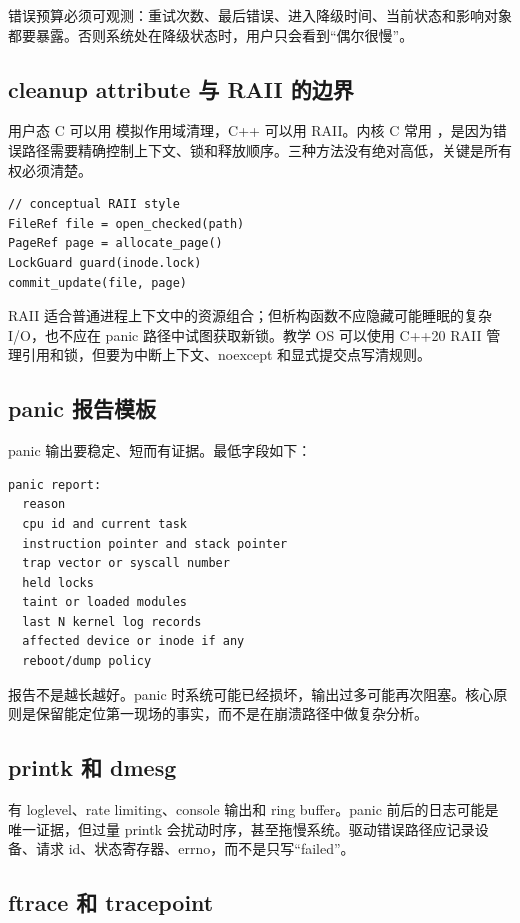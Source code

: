 错误预算必须可观测：重试次数、最后错误、进入降级时间、当前状态和影响对象都要暴露。否则系统处在降级状态时，用户只会看到“偶尔很慢”。

\subsection{cleanup attribute 与 RAII 的边界}

用户态 C 可以用  模拟作用域清理，C++ 可以用 RAII。内核 C 常用 ，是因为错误路径需要精确控制上下文、锁和释放顺序。三种方法没有绝对高低，关键是所有权必须清楚。

\begin{lstlisting}
// conceptual RAII style
FileRef file = open_checked(path)
PageRef page = allocate_page()
LockGuard guard(inode.lock)
commit_update(file, page)
\end{lstlisting}

RAII 适合普通进程上下文中的资源组合；但析构函数不应隐藏可能睡眠的复杂 I/O，也不应在 panic 路径中试图获取新锁。教学 OS 可以使用 C++20 RAII 管理引用和锁，但要为中断上下文、noexcept 和显式提交点写清规则。

\subsection{panic 报告模板}

panic 输出要稳定、短而有证据。最低字段如下：

\begin{lstlisting}
panic report:
  reason
  cpu id and current task
  instruction pointer and stack pointer
  trap vector or syscall number
  held locks
  taint or loaded modules
  last N kernel log records
  affected device or inode if any
  reboot/dump policy
\end{lstlisting}

报告不是越长越好。panic 时系统可能已经损坏，输出过多可能再次阻塞。核心原则是保留能定位第一现场的事实，而不是在崩溃路径中做复杂分析。

\subsection{printk 和 dmesg}

 有 loglevel、rate limiting、console 输出和 ring buffer。panic 前后的日志可能是唯一证据，但过量 printk 会扰动时序，甚至拖慢系统。驱动错误路径应记录设备、请求 id、状态寄存器、errno，而不是只写“failed”。

\subsection{ftrace 和 tracepoint}


